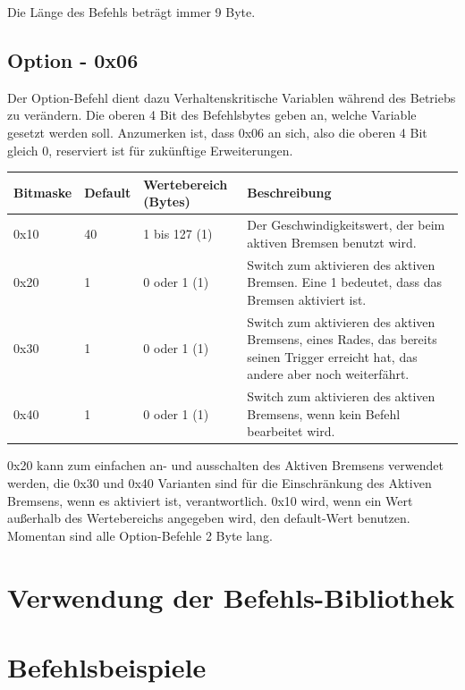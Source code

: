 \documentclass[a4paper]{article}
\begin{document}
	Die Länge des Befehls beträgt immer 9 Byte.

	\subsection{Option - 0x06}

	Der Option-Befehl dient dazu Verhaltenskritische Variablen während des Betriebs zu verändern.
	Die oberen 4 Bit des Befehlsbytes geben an, welche Variable gesetzt werden soll. Anzumerken ist,
	dass 0x06 an sich, also die oberen 4 Bit gleich 0, reserviert ist für zukünftige Erweiterungen.

	\begin{tabularx}{\linewidth}{|l|l|l|X|}
		\hline
		\textbf{Bitmaske} & \textbf{Default} & \textbf{Wertebereich (Bytes)} & \textbf{Beschreibung} \\
		\hline
		\hline
		0x10 & 40 & 1 bis 127 (1) & Der Geschwindigkeitswert, der beim aktiven Bremsen benutzt wird. \\
		\hline
		0x20 & 1 & 0 oder 1 (1) & Switch zum aktivieren des aktiven Bremsen. Eine 1 bedeutet, dass das Bremsen aktiviert ist. \\
		\hline
		0x30 & 1 & 0 oder 1 (1) & Switch zum aktivieren des aktiven Bremsens, eines Rades, das bereits seinen Trigger erreicht hat, das andere aber noch weiterfährt. \\
		\hline
		0x40 & 1 & 0 oder 1 (1) & Switch zum aktivieren des aktiven Bremsens, wenn kein Befehl bearbeitet wird. \\
		\hline
	\end{tabularx}

	0x20 kann zum einfachen an- und ausschalten des Aktiven Bremsens verwendet werden,
	die 0x30 und 0x40 Varianten sind für die Einschränkung des Aktiven Bremsens, wenn es
	aktiviert ist, verantwortlich. 0x10 wird, wenn ein Wert außerhalb des Wertebereichs
	angegeben wird, den default-Wert benutzen. Momentan sind alle Option-Befehle 2 Byte lang.
	
	\section{Verwendung der Befehls-Bibliothek}
	\section{Befehlsbeispiele}
\end{document}
